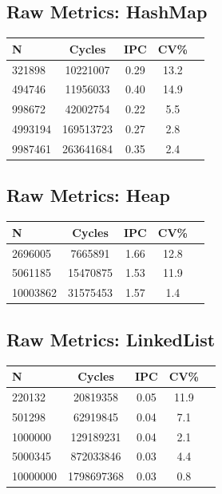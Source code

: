 \clearpage
\subsection*{Raw Metrics: HashMap}
\begin{table}[H]
\centering
{}
\begin{tabular}{@{}lcccc@{}}
\toprule
\rowcolor{teal!20} N & Cycles & IPC & CV\% \\ \midrule
321898 & 10221007 & 0.29 & 13.2 \\ 
494746 & 11956033 & 0.40 & 14.9 \\ 
998672 & 42002754 & 0.22 & 5.5 \\ 
4993194 & 169513723 & 0.27 & 2.8 \\ 
9987461 & 263641684 & 0.35 & 2.4 \\ 
\bottomrule
\end{tabular}
\end{table}

\subsection*{Raw Metrics: Heap}
\begin{table}[H]
\centering
{}
\begin{tabular}{@{}lcccc@{}}
\toprule
\rowcolor{teal!20} N & Cycles & IPC & CV\% \\ \midrule
2696005 & 7665891 & 1.66 & 12.8 \\ 
5061185 & 15470875 & 1.53 & 11.9 \\ 
10003862 & 31575453 & 1.57 & 1.4 \\ 
\bottomrule
\end{tabular}
\end{table}

\clearpage
\subsection*{Raw Metrics: LinkedList}
\begin{table}[H]
\centering
{}
\begin{tabular}{@{}lcccc@{}}
\toprule
\rowcolor{teal!20} N & Cycles & IPC & CV\% \\ \midrule
220132 & 20819358 & 0.05 & 11.9 \\ 
501298 & 62919845 & 0.04 & 7.1 \\ 
1000000 & 129189231 & 0.04 & 2.1 \\ 
5000345 & 872033846 & 0.03 & 4.4 \\ 
10000000 & 1798697368 & 0.03 & 0.8 \\ 
\bottomrule
\end{tabular}
\end{table}

